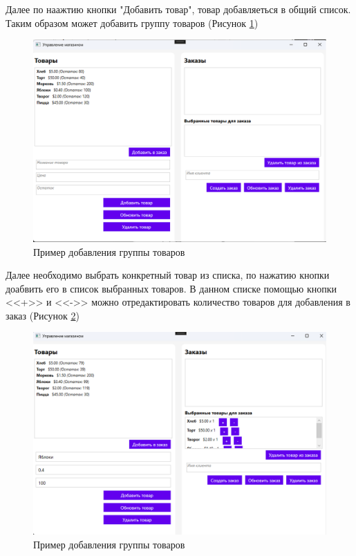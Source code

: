 \documentclass[12pt]{article}
\begin{document}
\newpage

Далее по наажтию кнопки "Добавить товар", товар добавляеться в общий список. Таким образом может добавить группу товаров (Рисунок \ref{fig:demo3})

\begin{figure}[ht]
	\centering
	\includegraphics[width=1.0\textwidth]{fig/image 60.png}
	\caption{Пример добавления группы товаров}
	\label{fig:demo3}
\end{figure}

\pagebreak

Далее необходимо выбрать конкретный товар из списка, по нажатию кнопки доабвить его в список выбранных товаров. В данном списке помощью кнопки <<+>> и <<->> можно отредактировать количество товаров для добавления в заказ (Рисунок \ref{fig:demo4})


\begin{figure}[ht]
	\centering
	\includegraphics[width=1.0\textwidth]{fig/image 61.png}
	\caption{Пример добавления группы товаров}
	\label{fig:demo4}
\end{figure}
\end{document}
